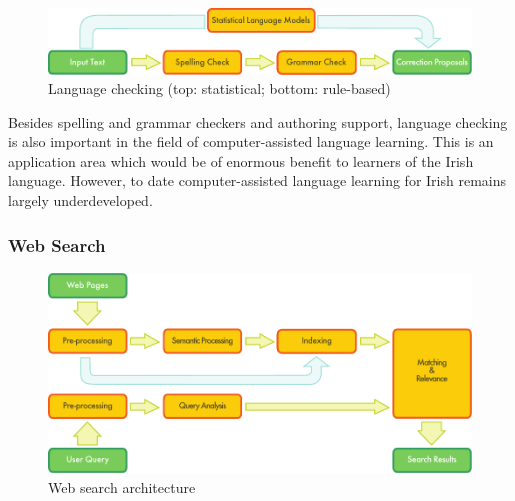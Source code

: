 \begin{multicols}{2}
\begin{figure}[htb]
  \center
  \includegraphics[width=\textwidth]{../_media/english/language_checking}
  \caption{Language checking (top: statistical; bottom: rule-based)}
  \label{fig:langcheckingaarch_en}
\end{figure}



Besides spelling and grammar checkers and authoring support, language checking is also important in the field of computer-assisted language learning. This is an application area which would be of enormous benefit to learners of the Irish language. However, to date computer-assisted language learning for Irish remains largely underdeveloped.

\subsubsection{Web Search}

\begin{figure}[htb]
  \center
  \includegraphics[width=\textwidth]{../_media/english/web_search_architecture}
  \caption{Web search architecture}
  \label{fig:websearcharch_en}
 \end{figure}


\end{multicols}
